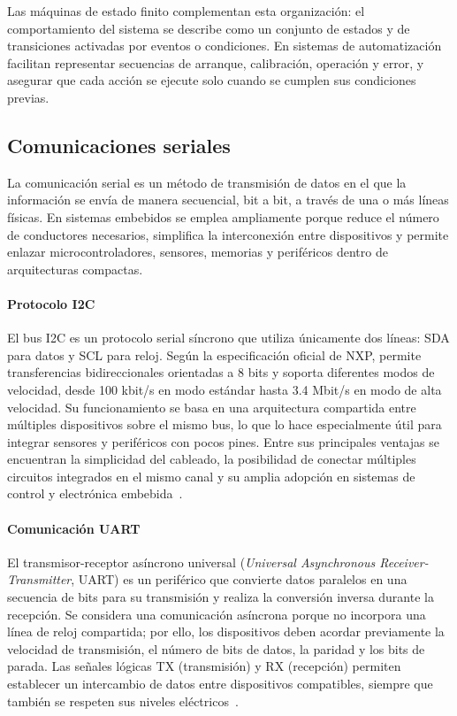 Las máquinas de estado finito complementan esta organización: el comportamiento del sistema se describe como un conjunto de estados y de transiciones activadas por eventos o condiciones. En sistemas de automatización facilitan representar secuencias de arranque, calibración, operación y error, y asegurar que cada acción se ejecute solo cuando se cumplen sus condiciones previas.

\subsection{Comunicaciones seriales}
La comunicación serial es un método de transmisión de datos en el que la información se envía de manera secuencial, bit a bit, a través de una o más líneas físicas. En sistemas embebidos se emplea ampliamente porque reduce el número de conductores necesarios, simplifica la interconexión entre dispositivos y permite enlazar microcontroladores, sensores, memorias y periféricos dentro de arquitecturas compactas.

\paragraph{Protocolo I2C}
El bus I2C es un protocolo serial síncrono que utiliza únicamente dos líneas: SDA para datos y SCL para reloj. Según la especificación oficial de NXP, permite transferencias bidireccionales orientadas a 8 bits y soporta diferentes modos de velocidad, desde 100 kbit/s en modo estándar hasta 3.4 Mbit/s en modo de alta velocidad. Su funcionamiento se basa en una arquitectura compartida entre múltiples dispositivos sobre el mismo bus, lo que lo hace especialmente útil para integrar sensores y periféricos con pocos pines. Entre sus principales ventajas se encuentran la simplicidad del cableado, la posibilidad de conectar múltiples circuitos integrados en el mismo canal y su amplia adopción en sistemas de control y electrónica embebida~\cite{nxp2021i2c}.


\paragraph{Comunicación UART}
El transmisor-receptor asíncrono universal (\textit{Universal Asynchronous Receiver-Transmitter}, UART) es un periférico que convierte datos paralelos en una secuencia de bits para su transmisión y realiza la conversión inversa durante la recepción. Se considera una comunicación asíncrona porque no incorpora una línea de reloj compartida; por ello, los dispositivos deben acordar previamente la velocidad de transmisión, el número de bits de datos, la paridad y los bits de parada. Las señales lógicas TX (transmisión) y RX (recepción) permiten establecer un intercambio de datos entre dispositivos compatibles, siempre que también se respeten sus niveles eléctricos~\cite{pena2020uart}.

